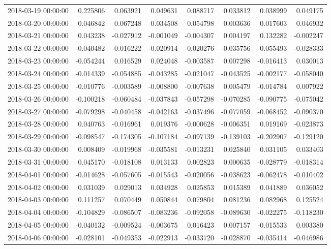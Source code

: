 \begin{tabular}{lrrrrrrr}
2018-03-19 00:00:00 & 0.225806 & 0.063921 & 0.049631 & 0.088717 & 0.033812 & 0.038999 & 0.049175 \\
2018-03-20 00:00:00 & 0.046842 & 0.067248 & 0.034508 & 0.054798 & 0.003636 & 0.017603 & 0.046932 \\
2018-03-21 00:00:00 & 0.043238 & -0.027912 & -0.001049 & -0.004307 & 0.004197 & 0.132282 & -0.002247 \\
2018-03-22 00:00:00 & -0.040482 & -0.016222 & -0.020914 & -0.020276 & -0.035756 & -0.055493 & -0.028333 \\
2018-03-23 00:00:00 & -0.054244 & 0.016529 & 0.024048 & -0.003587 & 0.007298 & -0.016413 & 0.030013 \\
2018-03-24 00:00:00 & -0.014339 & -0.054885 & -0.043285 & -0.021047 & -0.043525 & -0.002177 & -0.058040 \\
2018-03-25 00:00:00 & -0.010776 & -0.003589 & -0.008800 & -0.007638 & 0.005479 & -0.014784 & 0.007922 \\
2018-03-26 00:00:00 & -0.100218 & -0.060484 & -0.037843 & -0.057298 & -0.070285 & -0.090775 & -0.075042 \\
2018-03-27 00:00:00 & -0.079298 & -0.040458 & -0.042163 & -0.037496 & -0.077059 & -0.068452 & -0.090370 \\
2018-03-28 00:00:00 & 0.040763 & -0.016961 & 0.019376 & -0.000628 & -0.006351 & 0.019169 & -0.023873 \\
2018-03-29 00:00:00 & -0.098547 & -0.174305 & -0.107184 & -0.097139 & -0.139103 & -0.202907 & -0.129120 \\
2018-03-30 00:00:00 & 0.008409 & -0.019968 & -0.035581 & -0.013231 & 0.025840 & 0.031105 & 0.033403 \\
2018-03-31 00:00:00 & 0.045170 & -0.018108 & 0.013133 & 0.002823 & 0.000635 & -0.028779 & -0.018314 \\
2018-04-01 00:00:00 & -0.014628 & -0.057605 & -0.015543 & -0.020056 & -0.038623 & -0.062478 & -0.010402 \\
2018-04-02 00:00:00 & 0.031039 & 0.029013 & 0.034928 & 0.025853 & 0.015389 & 0.041889 & 0.036052 \\
2018-04-03 00:00:00 & 0.111257 & 0.070449 & 0.050844 & 0.079804 & 0.081236 & 0.082968 & 0.125524 \\
2018-04-04 00:00:00 & -0.104829 & -0.086507 & -0.083236 & -0.092058 & -0.089630 & -0.022275 & -0.118230 \\
2018-04-05 00:00:00 & -0.040132 & -0.009524 & -0.003675 & 0.016423 & 0.007157 & -0.015533 & 0.003380 \\
2018-04-06 00:00:00 & -0.028101 & -0.049353 & -0.022913 & -0.033720 & -0.028870 & -0.035414 & -0.046986 \\

\end{tabular}
